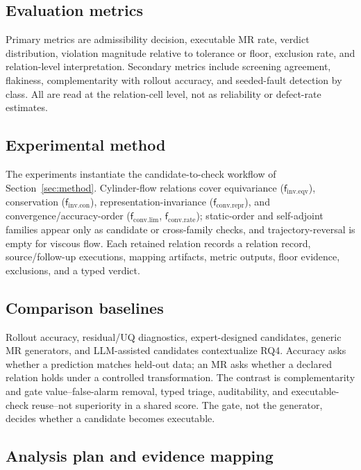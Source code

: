 \documentclass[preprint,12pt,authoryear]{elsarticle}
\providecommand{\fIeqv}{\mathsf{f}_{\mathrm{inv}.\mathrm{eqv}}}
\providecommand{\fIcon}{\mathsf{f}_{\mathrm{inv}.\mathrm{con}}}
\providecommand{\fClim}{\mathsf{f}_{\mathrm{conv}.\mathrm{lim}}}
\providecommand{\fCrate}{\mathsf{f}_{\mathrm{conv}.\mathrm{rate}}}
\providecommand{\fCrepr}{\mathsf{f}_{\mathrm{conv}.\mathrm{repr}}}
\begin{document}
\subsection{Evaluation metrics}
\label{subsec:metrics}

Primary metrics are admissibility decision, executable MR rate, verdict distribution, violation magnitude relative to tolerance or floor, exclusion rate, and relation-level interpretation. Secondary metrics include screening agreement, flakiness, complementarity with rollout accuracy, and seeded-fault detection by class. All are read at the relation-cell level, not as reliability or defect-rate estimates.

\subsection{Experimental method}
\label{subsec:experimental-method}

The experiments instantiate the candidate-to-check workflow of Section~\ref{sec:method}. Cylinder-flow relations cover equivariance ($\fIeqv$), conservation ($\fIcon$), representation-invariance ($\fCrepr$), and convergence/accuracy-order ($\fClim$, $\fCrate$); static-order and self-adjoint families appear only as candidate or cross-family checks, and trajectory-reversal is empty for viscous flow. Each retained relation records a relation record, source/follow-up executions, mapping artifacts, metric outputs, floor evidence, exclusions, and a typed verdict.

\subsection{Comparison baselines}
\label{subsec:baselines}

Rollout accuracy, residual/UQ diagnostics, expert-designed candidates, generic MR generators, and LLM-assisted candidates contextualize RQ4. Accuracy asks whether a prediction matches held-out data; an MR asks whether a declared relation holds under a controlled transformation. The contrast is complementarity and gate value--false-alarm removal, typed triage, auditability, and executable-check reuse--not superiority in a shared score. The gate, not the generator, decides whether a candidate becomes executable.

\subsection{Analysis plan and evidence mapping}
\label{subsec:rq-evidence}
\end{document}
